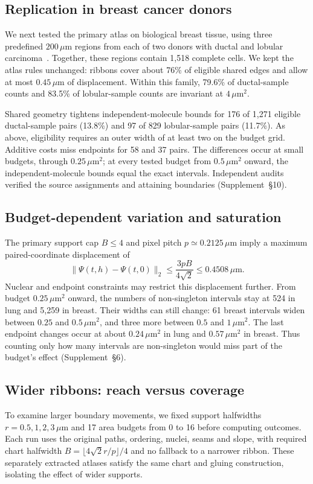 \documentclass[10pt,letterpaper]{article}
\begin{document}
\FloatBarrier
\subsection{Replication in breast cancer donors}\label{sec:donors}
We next tested the primary atlas on biological breast tissue, using three predefined $200\,\mu\mathrm m$ regions from each of two donors with ductal and lobular carcinoma~\cite{biologicalbreast}. Together, these regions contain 1,518 complete cells. We kept the atlas rules unchanged: ribbons cover about 76\% of eligible shared edges and allow at most $0.45\,\mu\mathrm m$ of displacement. Within this family, 79.6\% of ductal-sample counts and 83.5\% of lobular-sample counts are invariant at $4\,\mu\mathrm m^2$.

Shared geometry tightens independent-molecule bounds for 176 of 1,271 eligible ductal-sample pairs (13.8\%) and 97 of 829 lobular-sample pairs (11.7\%). As above, eligibility requires an outer width of at least two on the budget grid. Additive costs miss endpoints for 58 and 37 pairs. The differences occur at small budgets, through $0.25\,\mu\mathrm m^2$; at every tested budget from $0.5\,\mu\mathrm m^2$ onward, the independent-molecule bounds equal the exact intervals. Independent audits verified the source assignments and attaining boundaries (Supplement~\S10).

\subsection{Budget-dependent variation and saturation}\label{sec:saturation}
The primary support cap $B\le4$ and pixel pitch $p\simeq0.2125\,\mu\mathrm m$ imply a maximum paired-coordinate displacement of
\begin{equation}
 \|\Psi(t,h)-\Psi(t,0)\|_2\le\frac{3pB}{4\sqrt2}\le0.4508\,\mu\mathrm m.\label{eq:cap}
\end{equation}
Nuclear and endpoint constraints may restrict this displacement further. From budget $0.25\,\mu\mathrm m^2$ onward, the numbers of non-singleton intervals stay at 524 in lung and 5,259 in breast. Their widths can still change: 61 breast intervals widen between $0.25$ and $0.5\,\mu\mathrm m^2$, and three more between $0.5$ and $1\,\mu\mathrm m^2$. The last endpoint changes occur at about $0.24\,\mu\mathrm m^2$ in lung and $0.57\,\mu\mathrm m^2$ in breast. Thus counting only how many intervals are non-singleton would miss part of the budget's effect (Supplement~\S6).

\subsection{Wider ribbons: reach versus coverage}\label{sec:reach}
To examine larger boundary movements, we fixed support halfwidths $r=0.5,1,2,3\,\mu\mathrm m$ and 17 area budgets from 0 to 16 before computing outcomes. Each run uses the original paths, ordering, nuclei, seams and slope, with required chart halfwidth $B=\lfloor4\sqrt2r/p\rfloor/4$ and no fallback to a narrower ribbon. These separately extracted atlases satisfy the same chart and gluing construction, isolating the effect of wider supports.
\end{document}
